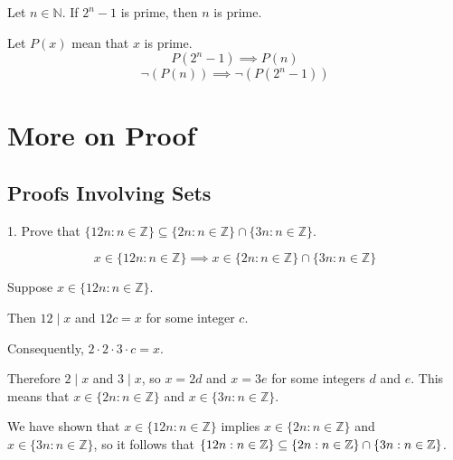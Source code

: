 \documentclass[openany, 12pt]{book}
\begin{document}
\begin{exercise}{}{}
	Let $n \in \mathbb{N}$. If $2^n-1$ is prime, then $n$ is prime.
	\begin{alist}
		\item Let $P(x)$ mean that $x$ is prime.
		$$
			P(2^n-1) \implies P(n)
		$$
		$$
			\neg(P(n))
			\implies
			\neg\left(P(2^n-1)\right)
		$$
	\end{alist}
\end{exercise}

\part{More on Proof}
\chapter{Proofs Involving Sets}
\begin{exercise}{}{}{1. Prove that $\{12 n: n \in \mathbb{Z}\} \subseteq\{2 n: n \in \mathbb{Z}\} \cap\{3 n: n \in \mathbb{Z}\}$.}
	\begin{alist}
		\item

		\[
			x \in \{12 n: n \in \mathbb{Z}\}
			\implies
			x \in \{2 n: n \in \mathbb{Z}\} \cap\{3 n: n \in \mathbb{Z}\}
		\]

		Suppose $x \in \{12 n: n \in \mathbb{Z}\}$.

		Then $12 \mid x$ and $12c=x$ for some integer $c$.

		Consequently, $2\cdot2\cdot3\cdot c =x$.

		Therefore $2\mid x$ and $3\mid x$, so $x =2d$ and $x=3e$ for some integers
		$d$ and $e$.
		This means that $x \in \{2 n: n \in \mathbb{Z}\}$ and $x \in \{3 n: n \in
			\mathbb{Z}\}$.

		We have shown that
		$x \in \{12 n: n \in \mathbb{Z}\}$
		implies
		$x \in\{2n: n \in \mathbb{Z}\}$
		and
		$x \in\{3n: n \in \mathbb{Z}\}$,
		so it follows that
		$\{12 n: n \in \mathbb{Z}\} \subseteq\{2 n: n \in \mathbb{Z}\} \cap\{3 n: n \in
			\mathbb{Z}\}$.
	\end{alist}
\end{exercise}
\end{document}
